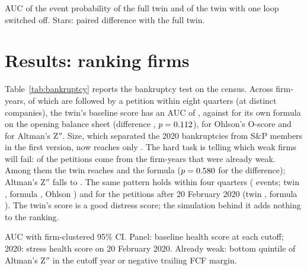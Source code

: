 \documentclass[11pt]{article}
\begin{document}
\begin{table}[t]
\centering\footnotesize
\begin{threeparttable}
\caption{Feedback loops evaluated on the events they are meant to produce}
\label{tab:loops}

\begin{tablenotes}\footnotesize
\item AUC of the event probability of the full twin and of the twin with one loop switched off. Stars: paired difference with the full twin.
\end{tablenotes}
\end{threeparttable}
\end{table}

\section{Results: ranking firms}\label{sec:ranking}
Table~\ref{tab:bankruptcy} reports the bankruptcy test on the census. Across \BkPanN{} firm-years, \BkPanEv{} of which are followed by a petition within eight quarters (at \BkPanFirms{} distinct companies), the twin's baseline score has an AUC of \BkPanTwin, against \BkPanFormula{} for its own formula on the opening balance sheet (difference \BkPanFormulaDiff, $p=0.112$), \BkPanOhlson{} for Ohlson's O-score and \BkPanAltman{} for Altman's Z$''$. Size, which separated the 2020 bankruptcies from S\&P members in the first version, now reaches only \BkPanSize. The hard task is telling which weak firms will fail: \BkWeakShare{} of the petitions come from the \BkWeakN{} firm-years that were already weak. Among them the twin reaches \BkWeakTwin{} and the formula \BkWeakFormula{} ($p=0.580$ for the difference); Altman's Z$''$ falls to \BkWeakAltman. The same pattern holds within four quarters (\BkFourEv{} events; twin \BkFourTwin, formula \BkFourFormula, Ohlson \BkFourOhlson) and for the \BkTwentyEv{} petitions after 20 February 2020 (twin \BkTwentyTwin, formula \BkTwentyFormula). The twin's score is a good distress score; the simulation behind it adds nothing to the ranking.

\begin{table}[t]
\centering\scriptsize
\caption{Bankruptcy petitions (8-K Item 1.03), all non-financial filers}
\label{tab:bankruptcy}

\par\smallskip
\begin{minipage}{\linewidth}\footnotesize
AUC with firm-clustered 95\% CI. Panel: baseline health score at each cutoff; 2020: stress health score on 20 February 2020. Already weak: bottom quintile of Altman's Z$''$ in the cutoff year or negative trailing FCF margin.
\end{minipage}
\end{table}
\end{document}
